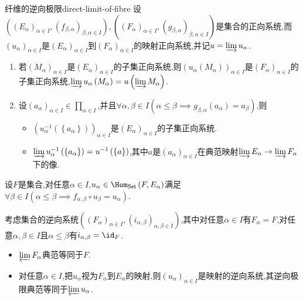 \begin{corollary}{纤维的逆向极限}{direct-limit-of-fibre}
	设$\left(\left(E_{\alpha}\right)_{\alpha\in I},\left(f_{\beta,\alpha}\right)_{\beta,\alpha\in I}\right),\left(\left(F_{\alpha}\right)_{\alpha\in I},\left(g_{\beta,\alpha}\right)_{\beta,\alpha\in I}\right)$是集合的正向系统,而$\left(u_{\alpha}\right)_{\alpha\in I}$是$\left(E_{\alpha}\right)_{\alpha\in I}$到$\left(F_{\alpha}\right)_{\alpha\in I}$的映射正向系统,并记$u=\varinjlim u_{\alpha}$.
	\begin{enumerate}
		\item 若$\left(M_{\alpha}\right)_{\alpha\in I}$是$\left(E_{\alpha}\right)_{\alpha\in I}$的子集正向系统,则$\left(u_{\alpha}\left(M_{\alpha}\right)\right)_{\alpha\in I}$是$\left(F_{\alpha}\right)_{\alpha\in I}$的子集正向系统,$\varinjlim u_{\alpha}\left(M_{\alpha}\right)=u\left(\varinjlim M_{\alpha}\right)$.
		\item 设$\left(a_{\alpha}\right)_{\alpha\in I}\in\prod\limits_{\alpha\in I}$,并且$\forall\alpha,\beta\in I\left(\alpha\leq\beta\implies g_{\beta,\alpha}\left(a_{\alpha}\right)=a_{\beta}\right)$.则
		\begin{itemize}
			\item $\left(u_{\alpha}^{-1}\left(\left\{a_{\alpha}\right\}\right)\right)_{\alpha\in I}$是$\left(E_{\alpha}\right)_{\alpha\in I}$的子集正向系统.
			\item $\varinjlim u_{\alpha}^{-1}\left(\left\{a_{\alpha}\right\}\right)=u^{-1}\left(\left\{a\right\}\right)$,其中$a$是$\left(a_{\alpha}\right)_{\alpha\in I}$在典范映射$\varinjlim E_{\alpha}\to\varinjlim F_{\alpha}$下的像.
		\end{itemize}
	\end{enumerate}
\end{corollary}

\begin{remark}{}{}
	设$F$是集合,对任意$\alpha\in I$,$u_{\alpha}\in\Hom_{\mathsf{Set}}\left(F,E_{\alpha}\right)$满足$\forall\beta\in I\left(\alpha\leq\beta\implies f_{\alpha,\beta}\circ u_{\beta}=u_{\alpha}\right)$.
	
	考虑集合的逆向系统$\left(\left(F_{\alpha}\right)_{\alpha\in I},\left(i_{\alpha,\beta}\right)_{\alpha,\beta\in I}\right)$,其中对任意$\alpha\in I$有$F_{\alpha}=F$,对任意$\alpha,\beta\in I$且$\alpha\leq\beta$有$i_{\alpha,\beta}=\id_{F}$.
	\begin{itemize}
		\item $\varprojlim F_{\alpha}$典范等同于$F$.
		\item 对任意$\alpha\in I$,把$u_{\alpha}$视为$F_{\alpha}$到$E_{\alpha}$的映射,则$\left(u_{\alpha}\right)_{\alpha\in I}$是映射的逆向系统,其逆向极限典范等同于$\varprojlim u_{\alpha}$.
	\end{itemize}
\end{remark}

